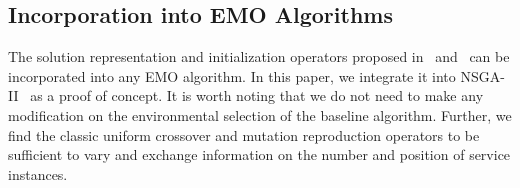 




\subsection{Incorporation into EMO Algorithms}
\label{sec:incorporation}

The solution representation and initialization operators proposed in~ and~ can be incorporated into any EMO algorithm. In this paper, we integrate it into NSGA-II~\cite{DebAPM02} as a proof of concept. It is worth noting that we do not need to make any modification on the environmental selection of the baseline algorithm. Further, we find the classic uniform crossover and mutation reproduction operators to be sufficient to vary and exchange information on the number and position of service instances.
